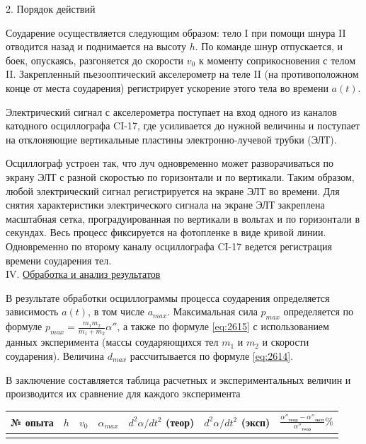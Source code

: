 \documentclass[specialist, subf, href, colorlinks=true, 14pt, final]{disser}
\theoremstyle{definition}
\newcommand{\npart}[2]{\noindent #1. \underline{#2}}
\begin{document}
2. Порядок действий

Соударение осуществляется следующим образом: тело I при помощи шнура II отводится назад и поднимается на высоту $h$. По команде шнур отпускается, и боек, опускаясь, разгоняется до скорости $v_0$ к моменту соприкосновения с телом II. Закрепленный пьезооптический акселерометр на теле II (на противоположном конце от места соударения) регистрирует ускорение этого тела во времени $a(t)$.

Электрический сигнал с акселерометра поступает на вход одного из каналов катодного осциллографа CI-17, где усиливается до нужной величины и поступает на отклоняющие вертикальные пластины электронно-лучевой трубки (ЭЛТ).

Осциллограф устроен так, что луч одновременно может разворачиваться по экрану ЭЛТ с разной скоростью по горизонтали и по вертикали. Таким образом, любой электрический сигнал регистрируется на экране ЭЛТ во времени. Для снятия характеристики электрического сигнала на экране ЭЛТ закреплена масштабная сетка, проградуированная по вертикали в вольтах и по горизонтали в секундах. Весь процесс фиксируется на фотопленке в виде кривой линии. Одновременно по второму каналу осциллографа CI-17 ведется регистрация времени соударения тел.\\

\npart{IV}{Обработка и анализ результатов}

В результате обработки осциллограммы процесса соударения определяется зависимость $a(t)$, в том числе $a_{max}$. Максимальная сила $p_{max}$ определяется по формуле $p_{max} = \frac{m_1 m_2}{m_1 + m_2} \alpha'' $, а также по формуле \eqref{eq:2615} с использованием данных эксперимента (массы соударяющихся тел $m_1$ и $m_2$ и скорости соударения). Величина $d_{max}$ рассчитывается по формуле \eqref{eq:2614}.

В заключение составляется таблица расчетных и экспериментальных величин и производится их сравнение для каждого эксперимента
  \begin{center}
    \begin{tabular}{|c|c|c|c|c|c|c|}
       \hline
        № опыта & $h$ & $v_0$ & $\alpha_{max}$ & $d^2\alpha/dt^2$ (теор) & $d^2\alpha/dt^2$ (эксп) & $\displaystyle \frac{\alpha''_{\text{теор}}- \alpha''_{\text{эксп}}}{\alpha''_{\text{теор}}} \% $ \\ \hline
         &&&&&&\\ \hline   
    \end{tabular} 
  \end{center}
\end{document}
